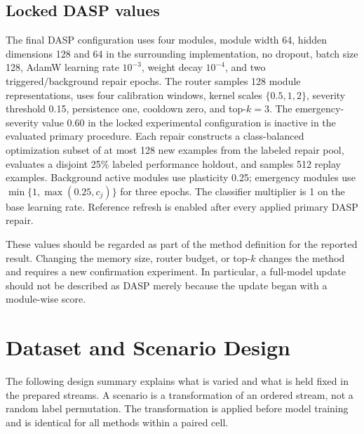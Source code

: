 \subsection{Locked DASP values}
The final DASP configuration uses four modules, module width 64, hidden dimensions 128 and 64 in the surrounding implementation, no dropout, batch size 128, AdamW learning rate $10^{-3}$, weight decay $10^{-4}$, and two triggered/background repair epochs. The router samples 128 module representations, uses four calibration windows, kernel scales $\{0.5,1,2\}$, severity threshold 0.15, persistence one, cooldown zero, and top-$k=3$. The emergency-severity value 0.60 in the locked experimental configuration is inactive in the evaluated primary procedure. Each repair constructs a class-balanced optimization subset of at most 128 new examples from the labeled repair pool, evaluates a disjoint 25\% labeled performance holdout, and samples 512 replay examples. Background active modules use plasticity 0.25; emergency modules use $\min\{1,\max(0.25,c_j)\}$ for three epochs. The classifier multiplier is 1 on the base learning rate. Reference refresh is enabled after every applied primary DASP repair.

These values should be regarded as part of the method definition for the reported result. Changing the memory size, router budget, or top-$k$ changes the method and requires a new confirmation experiment. In particular, a full-model update should not be described as DASP merely because the update began with a module-wise score.

\section{Dataset and Scenario Design}
\label{app:scenario-manifest}

The following design summary explains what is varied and what is held fixed in the prepared streams. A scenario is a transformation of an ordered stream, not a random label permutation. The transformation is applied before model training and is identical for all methods within a paired cell.

